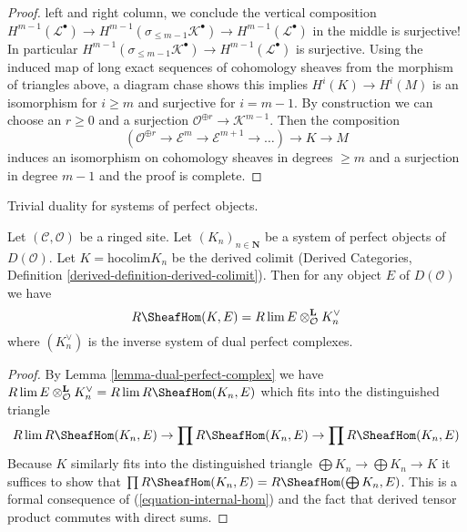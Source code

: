 \begin{proof}
left and right column, we conclude the vertical composition
$H^{m - 1}(\mathcal{L}^\bullet) \to
H^{m - 1}(\sigma_{\leq m - 1}\mathcal{K}^\bullet) \to
H^{m - 1}(\mathcal{L}^\bullet)$ in the middle is surjective!
In particular $H^{m - 1}(\sigma_{\leq m - 1}\mathcal{K}^\bullet) \to
H^{m - 1}(\mathcal{L}^\bullet)$ is surjective.
Using the induced map of long exact sequences of cohomology
sheaves from the morphism of triangles above, a diagram chase
shows this implies $H^i(K) \to H^i(M)$ is an isomorphism
for $i \geq m$ and surjective for $i = m - 1$.
By construction we can choose an $r \geq 0$ and a surjection
$\mathcal{O}^{\oplus r} \to \mathcal{K}^{m - 1}$. Then the
composition
$$
(\mathcal{O}^{\oplus r} \to \mathcal{E}^m \to
\mathcal{E}^{m + 1} \to \ldots ) \longrightarrow
K \longrightarrow M
$$
induces an isomorphism on cohomology sheaves in degrees $\geq m$ and
a surjection in degree $m - 1$ and the proof is complete.
\end{proof}

\begin{lemma}
\label{lemma-colim-and-lim-of-duals}
\begin{slogan}
Trivial duality for systems of perfect objects.
\end{slogan}
Let $(\mathcal{C}, \mathcal{O})$ be a ringed site. Let
$(K_n)_{n \in \mathbf{N}}$ be a system of perfect objects of $D(\mathcal{O})$.
Let $K = \text{hocolim} K_n$ be the derived colimit
(Derived Categories, Definition \ref{derived-definition-derived-colimit}).
Then for any object $E$ of $D(\mathcal{O})$ we have
$$
R\SheafHom(K, E) = R\lim E \otimes^\mathbf{L}_\mathcal{O} K_n^\vee
$$
where $(K_n^\vee)$ is the inverse system of dual perfect complexes.
\end{lemma}

\begin{proof}
By Lemma \ref{lemma-dual-perfect-complex} we have
$R\lim E \otimes^\mathbf{L}_\mathcal{O} K_n^\vee =
R\lim R\SheafHom(K_n, E)$
which fits into the distinguished triangle
$$
R\lim R\SheafHom(K_n, E) \to
\prod R\SheafHom(K_n, E) \to
\prod R\SheafHom(K_n, E)
$$
Because $K$ similarly fits into the distinguished triangle
$\bigoplus K_n \to \bigoplus K_n \to K$ it suffices to show that
$\prod R\SheafHom(K_n, E) = R\SheafHom(\bigoplus K_n, E)$.
This is a formal consequence of (\ref{equation-internal-hom})
and the fact that derived tensor product commutes with direct sums.
\end{proof}






